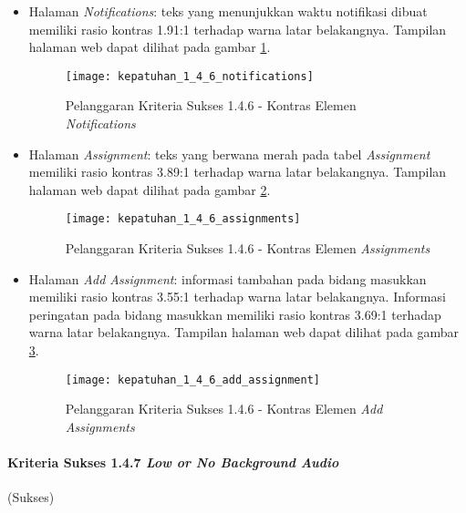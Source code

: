 \begin{itemize}
	\item Halaman \textit{Notifications}: teks yang menunjukkan waktu notifikasi dibuat memiliki rasio kontras 1.91:1 terhadap warna latar belakangnya. Tampilan halaman web dapat dilihat pada gambar \ref{fig:kepatuhan_1_4_6_notifications}.
	\begin{figure}[H]
		\centering  
		\texttt{[image: kepatuhan\_1\_4\_6\_notifications]}  
		\caption[Pelanggaran Kriteria Sukses 1.4.6 - Kontras Elemen \textit{Notifications}]{Pelanggaran Kriteria Sukses 1.4.6 - Kontras Elemen \textit{Notifications}} 
		\label{fig:kepatuhan_1_4_6_notifications} 
	\end{figure}

	\item Halaman \textit{Assignment}: teks yang berwana merah pada tabel \textit{Assignment} memiliki rasio kontras 3.89:1 terhadap warna latar belakangnya. Tampilan halaman web dapat dilihat pada gambar \ref{fig:kepatuhan_1_4_6_assignments}.
	\begin{figure}[H]
		\centering  
		\texttt{[image: kepatuhan\_1\_4\_6\_assignments]}  
		\caption[Pelanggaran Kriteria Sukses 1.4.6 - Kontras Elemen \textit{Assignments}]{Pelanggaran Kriteria Sukses 1.4.6 - Kontras Elemen \textit{Assignments}} 
		\label{fig:kepatuhan_1_4_6_assignments} 
	\end{figure}

	\item Halaman \textit{Add Assignment}: informasi tambahan pada bidang masukkan memiliki rasio kontras 3.55:1 terhadap warna latar belakangnya. Informasi peringatan pada bidang masukkan memiliki rasio kontras 3.69:1 terhadap warna latar belakangnya. Tampilan halaman web dapat dilihat pada gambar \ref{fig:kepatuhan_1_4_6_add_assignment}.
	\begin{figure}[H]
		\centering  
		\texttt{[image: kepatuhan\_1\_4\_6\_add\_assignment]}  
		\caption[Pelanggaran Kriteria Sukses 1.4.6 - Kontras Elemen \textit{Add Assignments}]{Pelanggaran Kriteria Sukses 1.4.6 - Kontras Elemen \textit{Add Assignments}} 
		\label{fig:kepatuhan_1_4_6_add_assignment} 
	\end{figure}

\end{itemize}

\paragraph{Kriteria Sukses 1.4.7 \textit{Low or No Background Audio}}
\label{subsubsec:kepatuhan_kriteria_1.4.7}
(Sukses) \\

